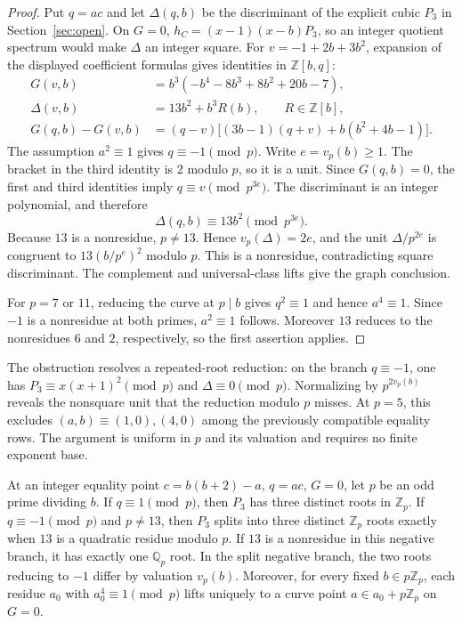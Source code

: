 \begin{proof}
Put $q=ac$ and let $\Delta(q,b)$ be the discriminant of the explicit
cubic $P_3$ in Section~\ref{sec:open}. On $G=0$,
$h_C=(x-1)(x-b)P_3$, so an integer quotient spectrum would make
$\Delta$ an integer square. For $v=-1+2b+3b^2$, expansion of the
displayed coefficient formulas gives identities in $\mathbb Z[b,q]$:
\begin{align*}
 G(v,b)&=b^3(-b^4-8b^3+8b^2+20b-7),\\
 \Delta(v,b)&=13b^2+b^3R(b),\qquad R\in\mathbb Z[b],\\
 G(q,b)-G(v,b)&=(q-v)\bigl[(3b-1)(q+v)+b(b^2+4b-1)\bigr].
\end{align*}
The assumption $a^2\equiv1$ gives $q\equiv-1\pmod p$. Write
$e=v_p(b)\geq1$. The bracket in the third identity is $2$ modulo $p$,
so it is a unit. Since $G(q,b)=0$, the first and third identities imply
$q\equiv v\pmod{p^{3e}}$. The discriminant is an integer polynomial,
and therefore
\[
 \Delta(q,b)\equiv13b^2\pmod{p^{3e}}.
\]
Because $13$ is a nonresidue, $p\ne13$. Hence $v_p(\Delta)=2e$,
and the unit $\Delta/p^{2e}$ is congruent to
$13(b/p^e)^2$ modulo $p$. This is a nonresidue, contradicting square
discriminant. The complement and universal-class lifts give the graph
conclusion.

For $p=7$ or $11$, reducing the curve at $p\mid b$ gives
$q^2\equiv1$ and hence $a^4\equiv1$. Since $-1$ is a nonresidue at
both primes, $a^2\equiv1$ follows. Moreover $13$ reduces to the
nonresidues $6$ and $2$, respectively, so the first assertion applies.
\end{proof}

The obstruction resolves a repeated-root reduction: on the branch
$q\equiv-1$, one has $P_3\equiv x(x+1)^2\pmod p$ and
$\Delta\equiv0\pmod p$. Normalizing by $p^{2v_p(b)}$ reveals the
nonsquare unit that the reduction modulo $p$ misses. At $p=5$, this
excludes $(a,b)\equiv(1,0),(4,0)$ among the previously compatible
equality rows. The argument is uniform in $p$ and its valuation and
requires no finite exponent base.

\begin{proposition}
\label{prop:equality-local-splitting}
At an integer equality point $c=b(b+2)-a$, $q=ac$, $G=0$, let $p$ be
an odd prime dividing $b$. If $q\equiv1\pmod p$, then $P_3$ has three
distinct roots in $\mathbb Z_p$. If $q\equiv-1\pmod p$ and $p\ne13$,
then $P_3$ splits into three distinct $\mathbb Z_p$ roots exactly when
$13$ is a quadratic residue modulo $p$. If $13$ is a nonresidue in this
negative branch, it has exactly one $\mathbb Q_p$ root.
In the split negative branch, the two roots reducing
to $-1$ differ by valuation $v_p(b)$.
Moreover, for every fixed $b\in p\mathbb Z_p$, each residue $a_0$ with
$a_0^4\equiv1\pmod p$ lifts uniquely to a curve point
$a\in a_0+p\mathbb Z_p$ on $G=0$.
\end{proposition}

